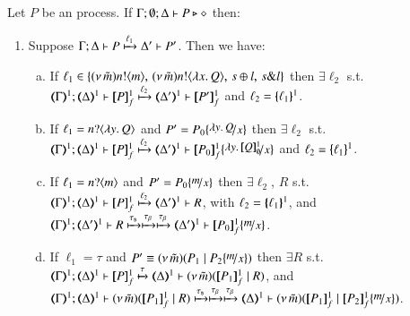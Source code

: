 
\begin{proposition}\rm
	\label{app:prop:op_corr_HOp_to_HO}
	Let $P$ be an \HOp process.
	If $\Gamma; \emptyset; \Delta \vdash P \triangleright \diamond$ then:
%
	\begin{enumerate}[1.]
		\item
			Suppose $\Gamma; \Delta \vdash P \xmapsto{\ell_1} \Delta' \vdash P'$. Then we have:
%
			\begin{enumerate}[a)]
				\item
					If $\ell_1 \in \{(\nu\, \tilde{m})n ! \langle m \rangle, \,(\nu\, \tilde{m})n ! \langle \lambda x.\,Q \rangle, \,s \oplus l, \,s \& l\}$
					then $\exists \ell_2$ s.t. \\
					$\horel{\tmap{\Gamma}{1}}{\tmap{\Delta}{1}}{\pmapp{P}{1}{f}}{\hby{\ell_2}}{\tmap{\Delta'}{1}}{\pmapp{P'}{1}{f}}$
					and $\ell_2 = \{\!\!\{\ell_1\}\!\!\}^{1}$.
			
				\item
					If $\ell_1 = n ? \langle \lambda y.\,Q \rangle$ and
					$P' = P_0 \subst{\abs{y}Q}{x}$
					then $\exists \ell_2$ s.t. \\
					$\horel{\tmap{\Gamma}{1}}{\tmap{\Delta}{1}}{\pmapp{P}{1}{f}}{\hby{\ell_2}}{\tmap{\Delta'}{1}}{\pmapp{P_0}{1}{f}\subst{\abs{y}\pmapp{Q}{1}{\emptyset}}{x}}$
					and $\ell_2 = \{\!\!\{\ell_1\}\!\!\}^{1}$.
			
				\item
					If $\ell_1 = n ? \langle m \rangle$
					and 
					$P' = P_0 \subst{m}{x}$
					then $\exists \ell_2$, $R$ s.t. 
					$\horel{\tmap{\Gamma}{1}}{\tmap{\Delta}{1}}{\pmapp{P}{1}{f}}{\hby{\ell_2}}{\tmap{\Delta'}{1}}{R}$,
					with $\ell_2 = \{\!\!\{\ell_1\}\!\!\}^{1}$, 
					and
					$\horel{\tmap{\Gamma}{1}}{\tmap{\Delta'}{1}}{R}{\hby{\stau} \hby{\btau} \hby{\btau}}
					{\tmap{\Delta'}{1}}{\pmapp{P_0}{1}{f}\subst{m}{x}}$.
						
				\item
					If $\ell_1 = \tau$
					and $P' \scong \newsp{\tilde{m}}{P_1 \Par P_2\subst{m}{x}}$
					then $\exists R$ s.t. \\
					$\horel{\tmap{\Gamma}{1}}{\tmap{\Delta}{1}}{\pmapp{P}{1}{f}}{\hby{\tau}}{\mapt{\Delta}^{1}}{\newsp{\tilde{m}}{\pmapp{P_1}{1}{f} \Par R}}$,
					and\\ 
					$\horel{\tmap{\Gamma}{1}}{\tmap{\Delta}{1}}{\newsp{\tilde{m}}{\pmapp{P_1}{1}{f} \Par R}}{\hby{\stau} \hby{\btau} \hby{\btau}}
					{\mapt{\Delta}^{1}}{\newsp{\tilde{m}}{\pmapp{P_1}{1}{f} \Par \pmapp{P_2}{1}{f}\subst{m}{x}}}$.
			

\end{enumerate}
\end{enumerate}
\end{proposition}
